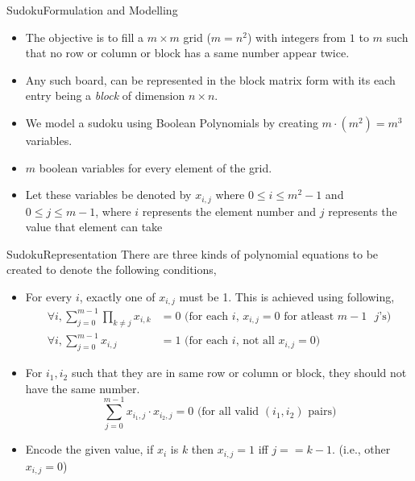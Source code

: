 \documentclass[aspectratio=169, handout, 10pt, hyperref=colorlinks]{beamer}
\begin{document}
\begin{frame}[allowframebreaks]{Sudoku}{Formulation and Modelling}
    \begin{itemize}
        \item The objective is to fill a $m\times m$ grid ($m=n^2$) with integers from $1$ to $m$ such that no row or column or block has a same number appear twice.
 \item Any such board, can be represented in the block matrix form with its each entry being a \emph{block} of dimension $n\times n$.
 \item We model a sudoku using Boolean Polynomials by creating $m\cdot(m^2)=m^3$ variables.
 \item $m$ boolean variables for every element of the grid.
 \item Let these variables be denoted by $x_{i,j}$ where $0\leq i\leq m^2-1$ and $0\leq j \leq m-1$, where $i$ represents the element number and $j$ represents the value that element can take
    \end{itemize}
    \end{frame}
    \begin{frame}{Sudoku}{Representation}
There are three kinds of polynomial equations to be created to denote the following conditions,
\begin{itemize}
    \item For every $i$, exactly one of $x_{i,j}$ must be 1. This is achieved using following,
    \begin{equation}
        \begin{aligned}
            \forall i, \sum_{j=0}^{m-1}\prod_{k\neq j} x_{i,k} &= 0 \text{ (for each $i$, $x_{i,j} = 0$ for atleast $m-1$\ $j$'s)}\\
            \forall i, \sum_{j=0}^{m-1} x_{i,j} &= 1 \text{ (for each $i$, not all $x_{i,j} = 0$) }
        \end{aligned}
    \end{equation}
    \item For $i_1,i_2$ such that they are in same row or column or block, they should not have the same number.
    \begin{equation}
        \sum_{j=0}^{m-1} x_{i_1,j}\cdot x_{i_2,j} = 0 \text{ (for all valid  $(i_1, i_2)$ pairs)}
    \end{equation}
    \item Encode the given value, if $x_i$ is $k$ then $x_{i,j}=1$ iff $j==k-1$. (i.e., other $x_{i,j}=0$)
\end{itemize}
\end{frame}
\end{document}

